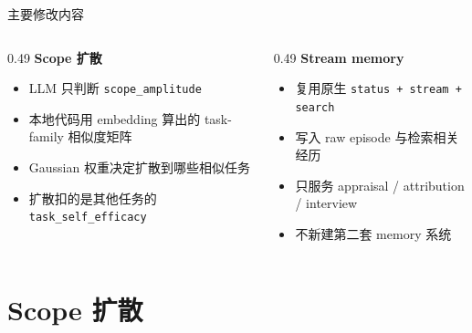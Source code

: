 \documentclass[aspectratio=169]{beamer}
\begin{document}
\begin{frame}[t]{主要修改内容}
\small
\begin{columns}[T]
\begin{column}{0.49\textwidth}
\textbf{Scope 扩散}
\begin{itemize}
    \item LLM 只判断 \texttt{scope\_amplitude}
    \item 本地代码用 embedding 算出的 task-family 相似度矩阵
    \item Gaussian 权重决定扩散到哪些相似任务
    \item 扩散扣的是其他任务的 \texttt{task\_self\_efficacy}
\end{itemize}
\end{column}

\begin{column}{0.49\textwidth}
\textbf{Stream memory}
\begin{itemize}
    \item 复用原生 \texttt{status + stream + search}
    \item 写入 raw episode 与检索相关经历
    \item 只服务 appraisal / attribution / interview
    \item 不新建第二套 memory 系统
\end{itemize}
\end{column}
\end{columns}

\vspace{0.2cm}
\end{frame}

\section{Scope 扩散}
\end{document}
